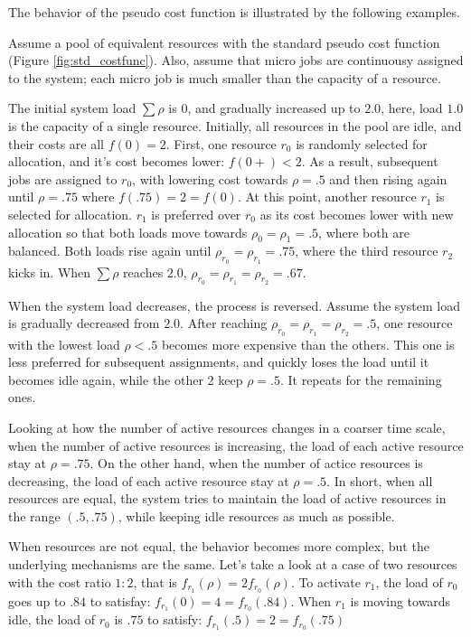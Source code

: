 The behavior of the pseudo cost function is illustrated by the
following examples.

Assume a pool of equivalent resources with the standard pseudo cost
function (Figure \ref{fig:std_costfunc}).
Also, assume that micro jobs are continuousy assigned to the
system; each micro job is much smaller than the capacity of a
resource.

The initial system load $\sum \rho$ is $0$, and gradually increased
up to $2.0$, here, load $1.0$ is the capacity of a single resource.
Initially, all resources in the pool are idle, and their costs are
all $f(0)= 2$.
First, one resource $r_{0}$ is randomly selected for allocation, and it's
cost becomes lower: $f(0+) < 2$. As a result, subsequent jobs are
assigned to $r_{0}$, with lowering cost towards $\rho = .5$ and then
rising again until $\rho = .75$ where $f(.75) = 2 = f(0)$.
At this point, another resource $r_{1}$ is selected for allocation.
$r_{1}$ is preferred over $r_{0}$ as its cost becomes lower with new
allocation so that both loads move towards $\rho_{0} = \rho_{1} = .5$,
where both are balanced.
Both loads rise again until $\rho_{r_{0}} = \rho_{r_{1}} = .75$,
where the third resource $r_{2}$ kicks in.
When $\sum \rho$ reaches $2.0$, $\rho_{r_{0}} = \rho_{r_{1}} = \rho_{r_{2}} = .67$.

When the system load decreases, the process is reversed.
Assume the system load is gradually decreased from $2.0$.
After reaching $\rho_{r_{0}} = \rho_{r_{1}} = \rho_{r_{2}} = .5$,
one resource with the lowest load $\rho < .5$ becomes more expensive
than the others.
This one is less preferred for subsequent assignments, and quickly
loses the load until it becomes idle again, while the other 2 keep
$\rho = .5$. It repeats for the remaining ones.

Looking at how the number of active resources changes in a coarser
time scale,
when the number of active resources is increasing, the load of each
active resource stay at $\rho = .75$.
On the other hand, when the number of actice resources is decreasing,
the load of each active resource stay at $\rho = .5$.
In short, when all resources are equal, the system tries to maintain
the load of active resources in the range $(.5, .75)$, while keeping
idle resources as much as possible.

When resources are not equal, the behavior becomes more complex, but
the underlying mechanisms are the same.
Let's take a look at a case of two resources with the cost ratio $1:2$,
that is $f_{r_1{}}(\rho) = 2 f_{r_{0}}(\rho)$.
To activate $r_{1}$, the load of $r_{0}$ goes up to $.84$ to satisfay:
$f_{r_{1}}(0) = 4 = f_{r_{0}}(.84)$.
When $r_{1}$ is moving towards idle, the load of $r_{0}$ is $.75$ to
satisfy: $f_{r_{1}}(.5) = 2 = f_{r_{0}}(.75)$

